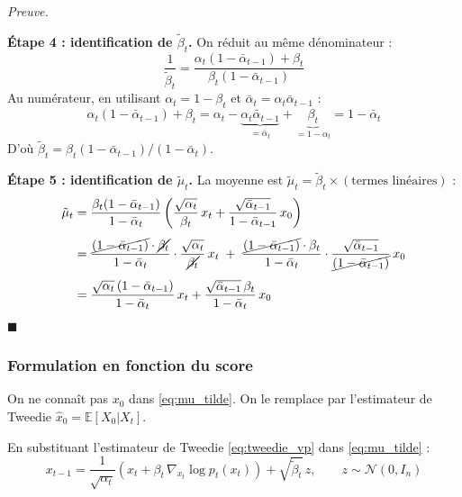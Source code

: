 \documentclass[12pt]{article}
\renewcommand{\qedsymbol}{$\blacksquare$}
\renewenvironment{proof}[1][\proofname]{%
  \par\medskip\noindent
  \textit{\color{proofgray}#1.}\enspace\ignorespaces
}{\hfill\qedsymbol\par\medskip}
\renewcommand{\proofname}{Preuve}
\begin{document}
\begin{proof}
\textbf{Étape 4 : identification de $\tilde{\beta}_t$.} On réduit au même dénominateur :
\[
\frac{1}{\tilde{\beta}_t} = \frac{\alpha_t(1-\bar{\alpha}_{t-1}) + \beta_t}{\beta_t(1-\bar{\alpha}_{t-1})}
\]
Au numérateur, en utilisant $\alpha_t = 1 - \beta_t$ et $\bar{\alpha}_t = \alpha_t \bar{\alpha}_{t-1}$ :
\[
\alpha_t(1-\bar{\alpha}_{t-1}) + \beta_t = \alpha_t - \underbrace{\alpha_t \bar{\alpha}_{t-1}}_{= \bar{\alpha}_t} + \underbrace{\beta_t}_{= 1-\alpha_t} = 1 - \bar{\alpha}_t
\]
D'où $\tilde{\beta}_t = \beta_t(1-\bar{\alpha}_{t-1})/(1-\bar{\alpha}_t)$.

\textbf{Étape 5 : identification de $\tilde{\mu}_t$.} La moyenne est $\tilde{\mu}_t = \tilde{\beta}_t \times (\text{termes linéaires})$ :
\begin{align*}
\tilde{\mu}_t &= \frac{\beta_t(1-\bar{\alpha}_{t-1})}{1-\bar{\alpha}_t} \left(\frac{\sqrt{\alpha_t}}{\beta_t}\, x_t + \frac{\sqrt{\bar{\alpha}_{t-1}}}{1-\bar{\alpha}_{t-1}}\, x_0\right) \\[4pt]
&= \frac{\cancel{(1-\bar{\alpha}_{t-1})} \cdot \cancel{\beta_t}}{1-\bar{\alpha}_t} \cdot \frac{\sqrt{\alpha_t}}{\cancel{\beta_t}}\, x_t \;+\; \frac{\cancel{(1-\bar{\alpha}_{t-1})} \cdot \beta_t}{1-\bar{\alpha}_t} \cdot \frac{\sqrt{\bar{\alpha}_{t-1}}}{\cancel{(1-\bar{\alpha}_{t-1})}}\, x_0 \\[4pt]
&= \frac{\sqrt{\alpha_t}\,(1-\bar{\alpha}_{t-1})}{1-\bar{\alpha}_t}\, x_t + \frac{\sqrt{\bar{\alpha}_{t-1}}\, \beta_t}{1-\bar{\alpha}_t}\, x_0
\end{align*}
\end{proof}

\subsubsection{Formulation en fonction du score}

On ne connaît pas $x_0$ dans \eqref{eq:mu_tilde}. On le remplace par l'estimateur de Tweedie $\hat{x}_0 = \mathbb{E}[X_0 | X_t]$.

\begin{resultbox}
\label{res:reverse_score}
En substituant l'estimateur de Tweedie \eqref{eq:tweedie_vp} dans \eqref{eq:mu_tilde} :
\begin{equation}
    \boxed{x_{t-1} = \frac{1}{\sqrt{\alpha_t}}\!\left(x_t + \beta_t\, \nabla_{x_t} \log p_t(x_t)\right) + \sqrt{\tilde{\beta}_t}\, z, \qquad z \sim \mathcal{N}(0, I_n)}
    \label{eq:reverse_score}
\end{equation}
\end{resultbox}
\end{document}
